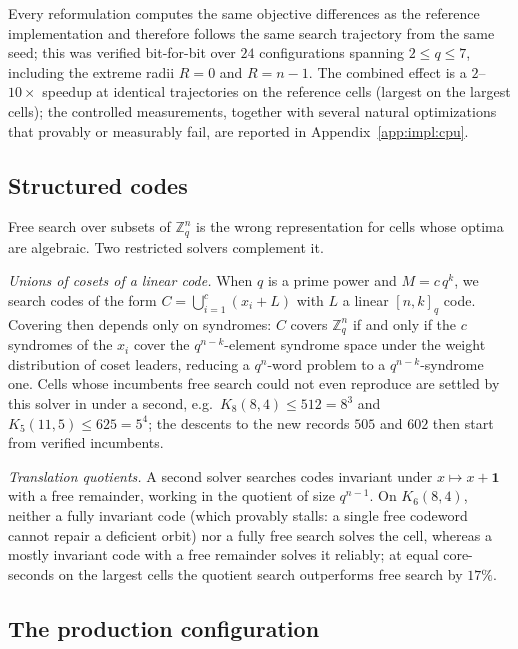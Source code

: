 \documentclass[11pt]{amsart}
\newcommand{\Kq}[3]{K_{#1}(#2,#3)}
\newcommand{\Zq}{\mathbb{Z}_q}
\begin{document}
Every reformulation computes the same objective differences as the
reference implementation and therefore follows the same search trajectory
from the same seed; this was verified bit-for-bit over $24$ configurations
spanning $2\le q\le 7$, including the extreme radii $R=0$ and $R=n-1$.
The combined effect is a $2$--$10\times$ speedup at identical trajectories
on the reference cells (largest on the largest cells); the controlled
measurements, together with several
natural optimizations that provably or measurably fail, are reported in
Appendix~\ref{app:impl:cpu}.

\subsection{Structured codes}\label{sec:structure}

Free search over subsets of $\Zq^n$ is the wrong representation for cells
whose optima are algebraic. Two restricted solvers complement it.

\emph{Unions of cosets of a linear code.} When $q$ is a prime power and
$M=c\,q^k$, we search codes of the form $C=\bigcup_{i=1}^{c}(x_i+L)$ with
$L$ a linear $[n,k]_q$ code. Covering then depends only on syndromes: $C$
covers $\Zq^n$ if and only if the $c$ syndromes of the $x_i$ cover the
$q^{n-k}$-element syndrome space under the weight distribution of coset
leaders, reducing a $q^n$-word problem to a $q^{n-k}$-syndrome one. Cells
whose incumbents free search could not even reproduce are settled by this
solver in under a second, e.g.\ $\Kq{8}{8}{4}\le 512=8^3$ and
$\Kq{5}{11}{5}\le 625=5^4$; the descents to the new records $505$ and $602$
then start from verified incumbents.

\emph{Translation quotients.} A second solver searches codes invariant
under $x\mapsto x+\mathbf{1}$ with a free remainder, working in the
quotient of size $q^{n-1}$. On $\Kq{6}{8}{4}$, neither a fully invariant
code (which provably stalls: a single free codeword cannot repair a
deficient orbit) nor a fully free search solves the cell, whereas a mostly
invariant code with a free remainder solves it reliably; at equal
core-seconds on the largest cells the quotient search outperforms free
search by $17\%$.

\subsection{The production configuration}\label{sec:arena}
\end{document}
